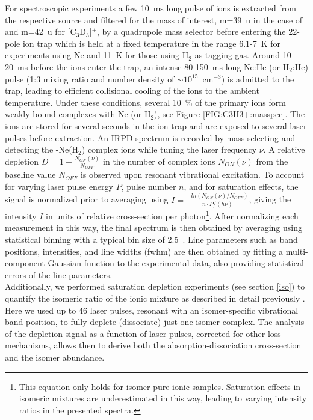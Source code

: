 For spectroscopic experiments a few 10~ms long pulse of ions is extracted from the respective source and filtered for the mass of interest, m=39~u in the case of \iso and m=42~u for [C$_3$D$_3$]$^+$, by a quadrupole mass selector before entering the 22-pole ion trap which is held at a fixed temperature in the range 6.1-7~K for experiments using Ne and 11~K for those using H$_2$ as tagging gas. Around 10-20~ms before the ions enter the trap, an intense 80-150~ms long Ne:He (or H$_2$:He) pulse (1:3 mixing ratio and number density of $\sim 10^{15}$~cm$^{-3}$) is admitted to the trap, leading to efficient collisional cooling of the ions to the ambient temperature. Under these conditions, several 10~\% of the primary ions form weakly bound complexes with Ne (or H$_2$), see Figure \ref{FIG:C3H3+:masspec}. The ions are stored for several seconds in the ion trap and are exposed to several laser pulses before extraction. An IRPD spectrum is recorded by mass-selecting and detecting the \ison-Ne(H$_2$) complex ions while tuning the laser frequency $\nu$. A relative depletion $D=1-\frac{N_{ON}(\nu)}{N_{OFF}}$ in the number of complex ions $N_{ON}(\nu)$ from the baseline value $N_{OFF}$ is observed upon resonant vibrational excitation. To account for varying laser pulse energy $P$, pulse number $n$, and for saturation effects, the signal is normalized prior to averaging using $I=\frac{- ln(N_{ON}(\nu)/N_{OFF})}{n\cdot P/(h\nu)}$, giving the intensity $I$ in units of relative cross-section per photon\footnote{This equation only holds for isomer-pure ionic samples. Saturation effects in isomeric mixtures are underestimated in this way, leading to varying intensity ratios in the presented spectra.}. After normalizing each measurement in this way, the final spectrum is then obtained by averaging using statistical binning with a typical bin size of 2.5~\wn. Line parameters such as band positions, intensities, and line widths (fwhm) are then obtained by fitting a multi-component Gaussian function to the experimental data, also providing statistical errors of the line parameters. \\

Additionally, we performed saturation depletion experiments (see section \ref{iso}) to quantify the isomeric ratio of the ionic mixture as described in detail previously \citep{JSB2018,jusko_felion_2019}. Here we used up to 46 laser pulses, resonant with an isomer-specific vibrational band position, to fully deplete (dissociate) just one isomer complex. The analysis of the depletion signal as a function of laser pulses, corrected for other loss-mechanisms, allows then to derive both the absorption-dissociation cross-section and the isomer abundance. \\

